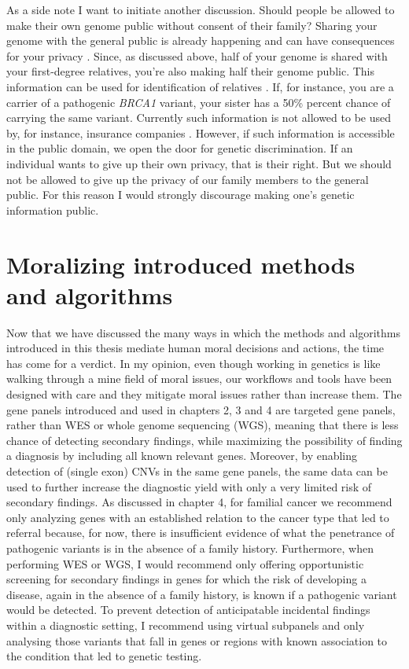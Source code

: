 As a side note I want to initiate another discussion. 
Should people be allowed to make their own genome public without consent of their family? 
Sharing your genome with the general public is already happening and can have consequences for your privacy \cite{Smith_2017b}. 
Since, as discussed above, half of your genome is shared with your first-degree relatives, you’re also making half their genome public. 
This information can be used for identification of relatives \cite{Kim_2018,Erlich_2018}. 
If, for instance, you are a carrier of a pathogenic \textsl{BRCA1} variant, your sister has a 50\% percent chance of carrying the same variant. 
Currently such information is not allowed to be used by, for instance, insurance companies \cite{Bin_2018}. 
However, if such information is accessible in the public domain, we open the door for genetic discrimination. 
If an individual wants to give up their own privacy, that is their right. 
But we should not be allowed to give up the privacy of our family members to the general public. For this reason I would strongly discourage making one’s genetic information public. 

\section{Moralizing introduced methods and algorithms}
Now that we have discussed the many ways in which the methods and algorithms introduced in this thesis mediate human moral decisions and actions, the time has come for a verdict. 
In my opinion, even though working in genetics is like walking through a mine field of moral issues, our workflows and tools have been designed with care and they mitigate moral issues rather than increase them. 
The gene panels introduced and used in chapters 2, 3 and 4 are targeted gene panels, rather than WES or whole genome sequencing (WGS), meaning that there is less chance of detecting secondary findings, while maximizing the possibility of finding a diagnosis by including all known relevant genes.
Moreover, by enabling detection of (single exon) CNVs in the same gene panels, the same data can be used to further increase the diagnostic yield with only a very limited risk of secondary findings. 
As discussed in chapter 4, for familial cancer we recommend only analyzing genes with an established relation to the cancer type that led to referral because, for now, there is insufficient evidence of what the penetrance of pathogenic variants is in the absence of a family history. 
Furthermore, when performing WES or WGS, I would recommend only offering opportunistic screening for secondary findings in genes for which the risk of developing a disease, again in the absence of a family history, is known if a pathogenic variant would be detected. 
To prevent detection of anticipatable incidental findings within a diagnostic setting, I recommend using virtual subpanels and only analysing those variants that fall in genes or regions with known association to the condition that led to genetic testing.

